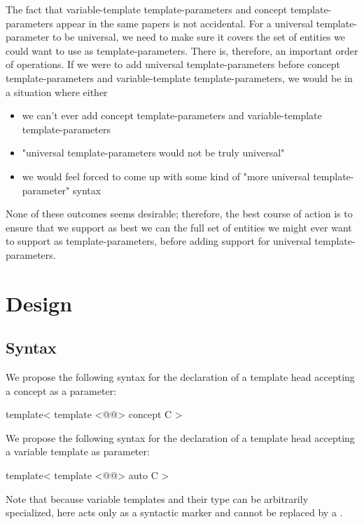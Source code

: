 \documentclass{wg21}
\begin{document}
The fact that variable-template template-parameters and concept template-parameters appear in the same papers is not accidental.
For a universal template-parameter to be universal, we need to make sure it covers the set of entities we could want to use as template-parameters.
There is, therefore, an important order of operations.
If we were to add universal template-parameters before concept template-parameters and variable-template template-parameters, we would be in a situation where either
\begin{itemize}
\item we can't ever add concept template-parameters and variable-template template-parameters
\item "universal template-parameters would not be truly universal"
\item we would feel forced to come up with some kind of "more universal template-parameter" syntax
\end{itemize}

None of these outcomes seems desirable; therefore, the best course of action is to ensure that we
support as best we can the full set of entities we might ever want to support as template-parameters, before adding support for universal template-parameters.

\section{Design}

\subsection{Syntax}

We propose the following syntax for the declaration of a template head accepting a concept as a parameter:

\begin{colorblock}
template<
    template <@@> concept C
>
\end{colorblock}

We propose the following syntax for the declaration of a template head accepting a variable template as parameter:

\begin{colorblock}
template<
    template <@@> auto C
>
\end{colorblock}

Note that because variable templates and their type can be arbitrarily specialized,  here acts
only as a syntactic marker and cannot be replaced by a .
\end{document}
